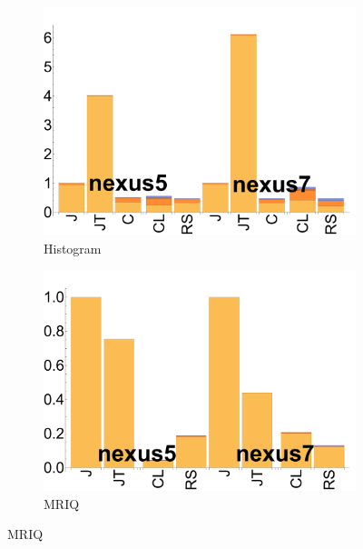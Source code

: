 \begin{figure}[tp]
  \begin{subfigure}[b]{0.24\textwidth}
      \centering
      \includegraphics[width=\textwidth]{data/bbattery_histogram.pdf}
      \caption{Histogram}\label{fig:b_histo}
  \end{subfigure}%

  \begin{subfigure}[b]{0.24\textwidth}
      \centering
      \includegraphics[width=\textwidth]{data/bbattery_mriq.pdf}
      \caption{MRIQ} \label{fig:b_MRIQ}
  \end{subfigure}


\end{figure}
